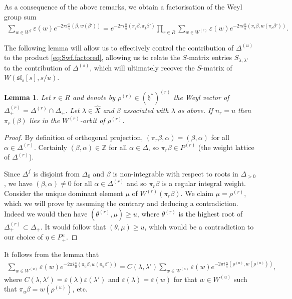 \documentclass[12pt]{amsart}
\theoremstyle{plain}
\newtheorem{lemma}[thm]{Lemma}
\theoremstyle{definition}
\numberwithin{equation}{section}
\newcommand{\laset}{\widehat{X}}
\newcommand{\al}{\alpha}
\newcommand{\la}{\lambda}
\newcommand{\D}{\Delta}
\newcommand{\Z}{\mathbb{Z}}
\newcommand{\h}{\mathfrak{h}}
\newcommand{\sll}{\mathfrak{sl}}
\begin{document}
As a consequence of the above remarks, we obtain a factorisation of the Weyl group sum
\begin{align}\label{eq:Swf.factored}
\sum_{w \in W^f} \varepsilon(w) e^{-2\pi i \frac{n}{u} (\beta, w(\beta'))} = e^{-2\pi i \frac{n}{u} (\pi_f\beta, \pi_f\beta')} \prod_{r \in R} \sum_{w \in W^{(r)}} \varepsilon(w) e^{-2\pi i \frac{n}{u} (\pi_r\beta, w(\pi_r\beta'))}.
\end{align}

The following lemma will allow us to effectively control the contribution of $\D^{(u)}$ to the product \eqref{eq:Swf.factored}, allowing us to relate the $S$-matrix entries $S_{\la, \la'}$ to the contribution of $\D^{(s)}$, which will ultimately recover the $S$-matrix of $W(\sll_s[s], s/u)$.
\begin{lemma}\label{lem:u.proj.rho}
Let $r \in R$ and denote by $\rho^{(r)} \in (\h^*)^{(r)}$ the Weyl vector of $\D^{(r)}_+ = \D^{(r)} \cap \D_+$. Let $\la \in \laset$ and $\beta$ associated with $\la$ as above. If $n_r = u$ then $\pi_r(\beta)$ lies in the $W^{(r)}$-orbit of $\rho^{(r)}$.
\end{lemma}

\begin{proof}
By definition of orthogonal projection, $(\pi_r\beta, \al) = (\beta, \al)$ for all $\al \in \D^{(r)}$. Certainly $(\beta, \al) \in \Z$ for all $\al \in \D$, so $\pi_r\beta \in P^{(r)}$ (the weight lattice of $\D^{(r)}$).

Since $\D^f$ is disjoint from $\D_0$ and $\beta$ is non-integrable with respect to roots in $\D_{>0}$, we have $(\beta, \al) \neq 0$ for all $\al \in \D^{(r)}$ and so $\pi_r\beta$ is a regular integral weight. Consider the unique dominant element $\mu$ of $W^{(r)}(\pi_r\beta)$. We claim $\mu = \rho^{(r)}$, which we will prove by assuming the contrary and deducing a contradiction. Indeed we would then have $(\theta^{(r)}, \mu) \geq u$, where $\theta^{(r)}$ is the highest root of $\D^{(r)}_+ \subset \D_+$. It would follow that $(\theta, \mu) \geq u$, which would be a contradiction to our choice of $\eta \in P_+^{u}$.
\end{proof}
It follows from the lemma that
\begin{align*}
\sum_{w \in W^{(u)}} \varepsilon(w) e^{-2\pi i \frac{n}{u} (\pi_u\beta, w(\pi_u\beta'))} = C(\la, \la') \sum_{w \in W^{(u)}} \varepsilon(w) e^{-2\pi i \frac{n}{u} (\rho^{(u)}, w(\rho^{(u)}))},
\end{align*}
where $C(\la, \la') = \varepsilon(\la) \varepsilon(\la')$ and $\varepsilon(\la) = \varepsilon(w)$ for that $w \in W^{(u)}$ such that $\pi_u\beta = w(\rho^{(u)})$, etc.
\end{document}
